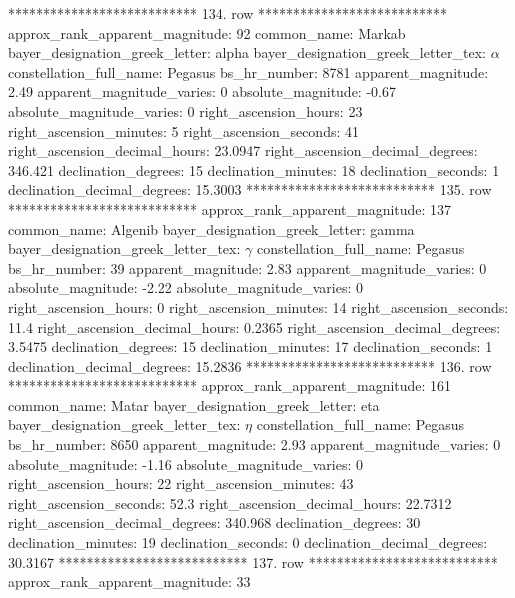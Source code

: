 *************************** 134. row ***************************
    approx_rank_apparent_magnitude: 92
                       common_name: Markab
    bayer_designation_greek_letter: alpha
bayer_designation_greek_letter_tex: $\alpha$
           constellation_full_name: Pegasus
                      bs_hr_number: 8781
                apparent_magnitude: 2.49
         apparent_magnitude_varies: 0
                absolute_magnitude: -0.67
         absolute_magnitude_varies: 0
             right_ascension_hours: 23
           right_ascension_minutes: 5
           right_ascension_seconds: 41
     right_ascension_decimal_hours: 23.0947
   right_ascension_decimal_degrees: 346.421
               declination_degrees: 15
               declination_minutes: 18
               declination_seconds: 1
       declination_decimal_degrees: 15.3003
*************************** 135. row ***************************
    approx_rank_apparent_magnitude: 137
                       common_name: Algenib
    bayer_designation_greek_letter: gamma
bayer_designation_greek_letter_tex: $\gamma$
           constellation_full_name: Pegasus
                      bs_hr_number: 39
                apparent_magnitude: 2.83
         apparent_magnitude_varies: 0
                absolute_magnitude: -2.22
         absolute_magnitude_varies: 0
             right_ascension_hours: 0
           right_ascension_minutes: 14
           right_ascension_seconds: 11.4
     right_ascension_decimal_hours: 0.2365
   right_ascension_decimal_degrees: 3.5475
               declination_degrees: 15
               declination_minutes: 17
               declination_seconds: 1
       declination_decimal_degrees: 15.2836
*************************** 136. row ***************************
    approx_rank_apparent_magnitude: 161
                       common_name: Matar
    bayer_designation_greek_letter: eta
bayer_designation_greek_letter_tex: $\eta$
           constellation_full_name: Pegasus
                      bs_hr_number: 8650
                apparent_magnitude: 2.93
         apparent_magnitude_varies: 0
                absolute_magnitude: -1.16
         absolute_magnitude_varies: 0
             right_ascension_hours: 22
           right_ascension_minutes: 43
           right_ascension_seconds: 52.3
     right_ascension_decimal_hours: 22.7312
   right_ascension_decimal_degrees: 340.968
               declination_degrees: 30
               declination_minutes: 19
               declination_seconds: 0
       declination_decimal_degrees: 30.3167
*************************** 137. row ***************************
    approx_rank_apparent_magnitude: 33
